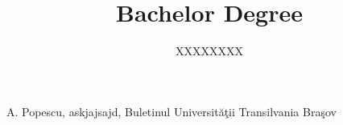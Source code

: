 \documentclass[a4paper, 12pt]{report}
\title{Bachelor Degree}
\author{XXXXXXXX}
\begin{document}
\maketitle


\listoffigures
\listoftables

\tableofcontents











\begin{thebibliography}{999}
A. Popescu, askjajsajd, Buletinul Universit\u a\c tii Transilvania Bra\c sov
\end{thebibliography}
\end{document}

